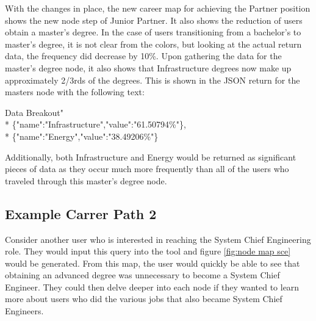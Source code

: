 With the changes in place, the new career map for achieving the Partner
position shows the new node step of Junior Partner.  It also shows the reduction
of users obtain a master's degree.  In the case of users transitioning from a
bachelor's to master's degree, it is not clear from the colors, but looking at
the actual return data, the frequency did decrease by 10\%.  Upon gathering the
data for the master's degree node, it also shows that Infrastructure degrees now
make up approximately 2/3rds of the degrees.  This is shown in the JSON
return for the masters node with the following text:

\begin{tt}
\begin{footnotesize}
\indent Data Breakout"\\*
\indent \indent \indent \{"name":"Infrastructure","value":"61.50794\%"\},\\*
\indent \indent \indent \{"name":"Energy","value":"38.49206\%"\}
\end{footnotesize}
\end{tt}

\noindent Additionally, both Infrastructure and Energy would be returned as
significant pieces of data as they occur much more frequently than all of the
users who traveled through this master's degree node.

\subsection{Example Carrer Path 2 }
Consider another user who is interested in reaching the System Chief Engineering
role.  They would input this query into the tool and figure \ref{fig:node map
sce} would be generated.  From this map, the user would quickly be able to see
that obtaining an advanced degree was unnecessary to become a System Chief
Engineer.  They could then delve deeper into each node if they wanted to learn
more about users who did the various jobs that also became System Chief
Engineers.


\usetikzlibrary{shapes,arrows,chains}

